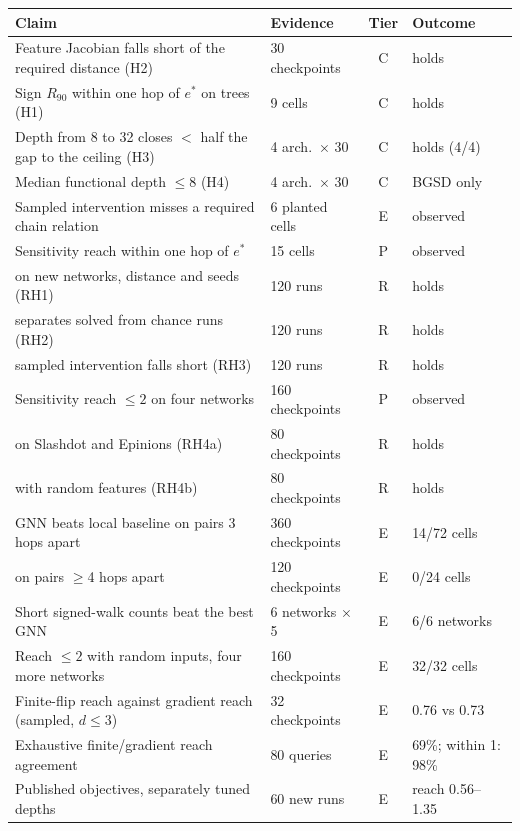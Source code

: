 \begin{tabular}{@{}p{}lcl@{}}
\toprule
Claim & Evidence & Tier & Outcome \\
\midrule
Feature Jacobian falls short of the required distance (H2) & 30 checkpoints & C & holds \\
Sign $R_{90}$ within one hop of $e^\ast$ on trees (H1) & 9 cells & C & holds \\
Depth from 8 to 32 closes $<$ half the gap to the ceiling (H3) & 4 arch.\ $\times$ 30 & C & holds (4/4) \\
Median functional depth $\le 8$ (H4) & 4 arch.\ $\times$ 30 & C & BGSD only \\
Sampled intervention misses a required chain relation & 6 planted cells & E & observed \\
Sensitivity reach within one hop of $e^\ast$ & 15 cells & P & observed \\
\quad on new networks, distance and seeds (RH1) & 120 runs & R & holds \\
\quad separates solved from chance runs (RH2) & 120 runs & R & holds \\
\quad sampled intervention falls short (RH3) & 120 runs & R & holds \\
Sensitivity reach $\le 2$ on four networks & 160 checkpoints & P & observed \\
\quad on Slashdot and Epinions (RH4a) & 80 checkpoints & R & holds \\
\quad with random features (RH4b) & 80 checkpoints & R & holds \\
GNN beats local baseline on pairs 3 hops apart & 360 checkpoints & E & 14/72 cells \\
\quad on pairs $\ge$4 hops apart & 120 checkpoints & E & 0/24 cells \\
Short signed-walk counts beat the best GNN & 6 networks $\times$ 5 & E & 6/6 networks \\
Reach $\le 2$ with random inputs, four more networks & 160 checkpoints & E & 32/32 cells \\
Finite-flip reach against gradient reach (sampled, $d\le3$) & 32 checkpoints & E & 0.76 vs 0.73 \\
Exhaustive finite/gradient reach agreement & 80 queries & E & 69\%; within 1: 98\% \\
Published objectives, separately tuned depths & 60 new runs & E & reach 0.56--1.35 \\
\bottomrule
\end{tabular}
